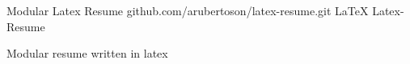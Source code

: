 \begin{section}
  \entry%
    {Modular Latex Resume} %
    {github.com/arubertoson/latex-resume.git} %
    {LaTeX} %
    {Latex-Resume} %
    {%
      \begin{entrylist}
        \item Modular resume written in latex
      \end{entrylist}
    }
\end{section}
